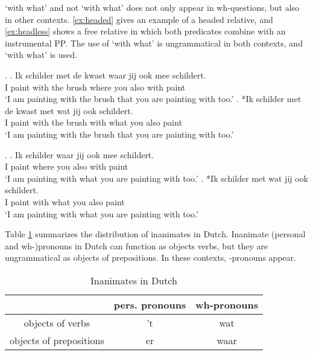 \documentclass[12pt]{article}
\begin{document}
 `with what' and not  `with what' does not only appear in wh-questions, but also in other contexts. \ref{ex:headed} gives an example of a headed relative, and \ref{ex:headless} shows a free relative in which both predicates combine with an instrumental PP. The use of  `with what' is ungrammatical in both contexts, and  `with what' is used.

\ex.\label{ex:headed}
\ag. Ik schilder met de kwast waar jij ook mee schildert.\\
 I paint with the brush where you also with paint\\
 `I am painting with the brush that you are painting with too.'
\bg. *Ik schilder met de kwast met wat jij ook schildert.\\
 I paint with the brush with what you also paint\\
 `I am painting with the brush that you are painting with too.'

 \ex.\label{ex:headless}
 \ag. Ik schilder waar jij ook mee schildert.\\
  I paint where you also with paint\\
  `I am painting with what you are painting with too.'
 \bg. *Ik schilder met wat jij ook schildert.\\
  I paint with what you also paint\\
  `I am painting with what you are painting with too.'

Table \ref{tbl:inanimates} summarizes the distribution of inanimates in Dutch. Inanimate (personal and wh-)pronouns in Dutch can function as objects verbs, but they are ungrammatical as objects of prepositions. In these contexts, -pronouns appear.

\begin{table}[ht]
	\center
	\caption {Inanimates in Dutch}
	\begin{minipage}{0.7\linewidth}
		\begin{tabularx}{\textwidth}{ccc}
		\toprule
                        & pers. pronouns & wh-pronouns \\
  	\midrule
objects of verbs        & 't             & wat         \\
objects of prepositions & er             & waar        \\
\bottomrule
\end{tabularx}
\label{tbl:inanimates}
\end{minipage}
\end{table}
\end{document}
